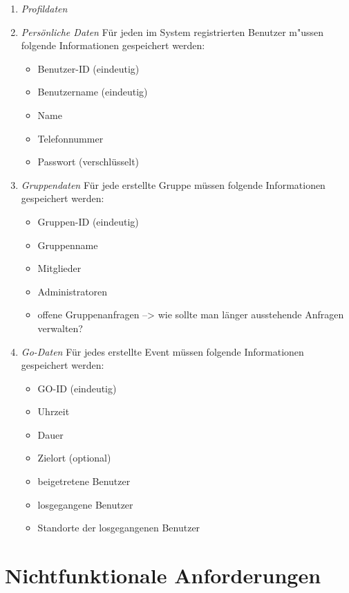\documentclass[parskip=full]{scrartcl}
\def\threedigits#1{%
  \ifnum#1<100 0\fi
  \ifnum#1<10 0\fi
  \number#1}
\begin{document}
\begin{enumerate}[label={\textbf{/D\protect\threedigits{\theenumi}0/}}, leftmargin=*]
	\item \textit{Profildaten} \label{Profildaten}
	\item \textit{Persönliche Daten} \label{persönliche Daten} Für jeden im System registrierten Benutzer m"ussen folgende Informationen gespeichert werden:
	\begin{itemize}
		\item Benutzer-ID (eindeutig)
		\item Benutzername (eindeutig)
		\item Name
		\item Telefonnummer
		\item Passwort (verschlüsselt)
	\end{itemize}
	\item \textit{Gruppendaten} Für jede erstellte Gruppe müssen folgende Informationen gespeichert werden:
	\begin{itemize}
	\item Gruppen-ID (eindeutig)
		\item Gruppenname
		\item Mitglieder
		\item Administratoren
		\item offene Gruppenanfragen --> wie sollte man länger ausstehende Anfragen verwalten?
	\end{itemize}
	\item \textit{Go-Daten} \label{GO-Daten}
	Für jedes erstellte Event müssen folgende Informationen gespeichert werden:
	\begin{itemize}
		\item GO-ID (eindeutig)
		\item Uhrzeit
		\item Dauer
		\item Zielort (optional)
		\item beigetretene Benutzer
		\item losgegangene Benutzer
		\item Standorte der losgegangenen Benutzer
	\end{itemize}
\end{enumerate}

\newpage
\section{Nichtfunktionale Anforderungen}
\end{document}
